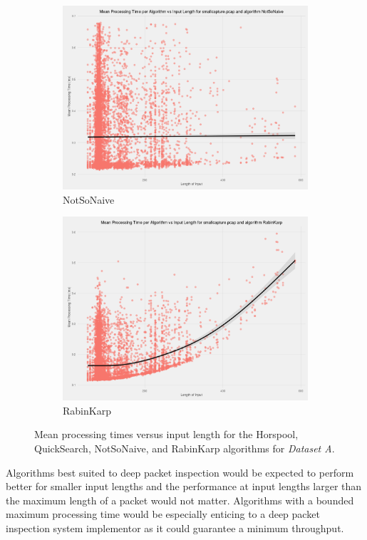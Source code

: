 \documentclass[11pt]{article}
\begin{document}
\begin{figure}[!htb]
\begin{subfigure}[b]{0.45\textwidth}
      \includegraphics[width=\textwidth]{images/scatter_mean_vs_input_length_NotSoNaive}
      \caption{NotSoNaive}
  \end{subfigure}
  \begin{subfigure}[b]{0.45\textwidth}
      \includegraphics[width=\textwidth]{images/scatter_mean_vs_input_length_RabinKarp}
      \caption{RabinKarp}
  \end{subfigure}
  \caption{Mean processing times versus input length for the Horspool, QuickSearch, NotSoNaive, and RabinKarp algorithms for \textit{Dataset A}.}
  \label{figure-individualalgorithmsvslength}
\end{figure}


Algorithms best suited to deep packet inspection would be expected to perform better for smaller input lengths and the performance at input lengths larger than the maximum length of a packet would not matter. Algorithms with a bounded maximum processing time would be especially enticing to a deep packet inspection system implementor as it could guarantee a minimum throughput. 
\end{document}

